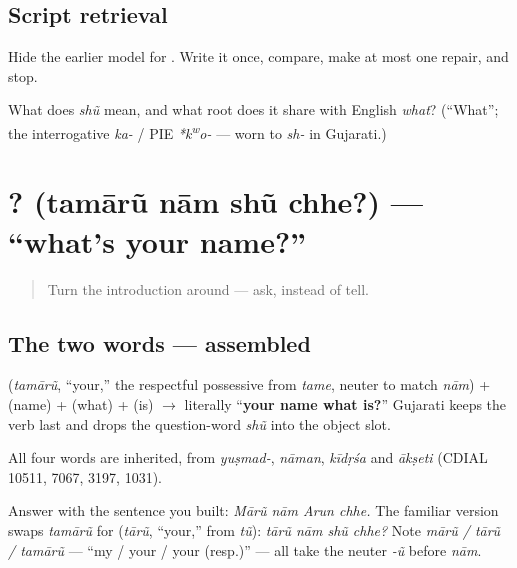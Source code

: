 \subsection*{Script retrieval}
Hide the earlier model for \textbf{}. Write it once, compare, make at most one repair, and stop.

\begin{tcolorbox}[breakable,colback=teal!4,colframe=teal!35!black,title={Before you move on}]
What does \emph{shũ} mean, and what root does it share with English \emph{what}? (\textquotedblleft{}What\textquotedblright{}; the interrogative \emph{ka-} / PIE \emph{*k\textsuperscript{w}o-} — worn to \emph{sh-} in Gujarati.)
\end{tcolorbox}
\section[\texorpdfstring{\gu{તમારું} \gu{નામ} \gu{શું} \gu{છે}? (tamārũ nām shũ chhe?)}{તમારું નામ શું છે? (tamārũ nām shũ chhe?)}]{   ? (tamārũ nām shũ chhe?) — \textquotedblleft{}what's your name?\textquotedblright{}}

\label{lesson:GU-C02-tamarun-naam-shun-chhe}



\begin{quote}
Turn the introduction around — ask, instead of tell.
\end{quote}

\subsection*{The two words — assembled}
\textbf{} (\emph{tamārũ}, \textquotedblleft{}your,\textquotedblright{} the respectful possessive from \emph{tame}, neuter to match \emph{nām}) + \textbf{} (name) + \textbf{} (what) + \textbf{} (is) $\to$ literally \textquotedblleft{}\textbf{your name what is?}\textquotedblright{} Gujarati keeps the verb last and drops the question-word \emph{shũ} into the object slot.

\begin{cousinweb}
All four words are inherited, from \emph{yuṣmad-}, \emph{nāman}, \emph{kīdṛśa} and \emph{ākṣeti} (CDIAL 10511, 7067, 3197, 1031).
\end{cousinweb}

\begin{grammarlens}[title={Grammar Lens: answering, and the familiar form}]
Answer with the sentence you built: \emph{Mārũ nām Arun chhe.} The familiar version swaps \emph{tamārũ} for \textbf{} (\emph{tārũ}, \textquotedblleft{}your,\textquotedblright{} from \emph{tũ}): \emph{tārũ nām shũ chhe?} Note \emph{mārũ / tārũ / tamārũ} — \textquotedblleft{}my / your / your (resp.)\textquotedblright{} — all take the neuter \emph{-ũ} before \emph{nām}.
\end{grammarlens}

